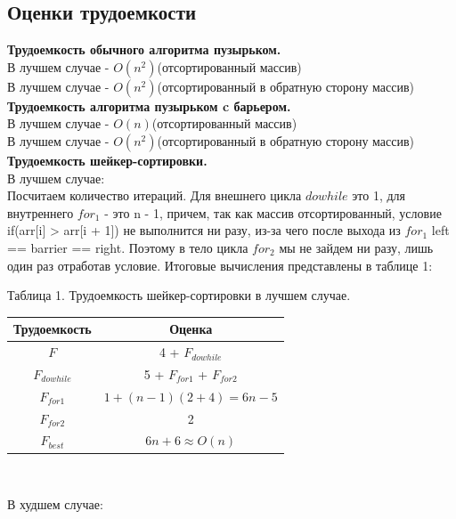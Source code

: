 \documentclass[a4paper, 14pt]{article}
\begin{document}
        \subsection{Оценки трудоемкости}
        \parindent=0cm
		\textbf{Трудоемкость обычного алгоритма пузырьком.}\\
		В лучшем случае - $O(n^2)$(отсортированный массив)\cite{knut}\\
		В лучшем случае - $O(n^2)$(отсортированный в обратную сторону массив)\cite{knut}\\
		\textbf{Трудоемкость алгоритма пузырьком c барьером.}\\
		В лучшем случае - $O(n)$(отсортированный массив)\cite{knut}\\
		В лучшем случае - $O(n^2)$(отсортированный в обратную сторону массив)\cite{knut}\\
		\textbf{Трудоемкость шейкер-сортировки.}\\
		В лучшем случае: \\
		\parindent=1cm
		Посчитаем количество итераций. Для внешнего цикла $do while$ это 1, для внутреннего $for_{1}$ - это n - 1, причем, так как массив отсортированный, условие if(arr[i] > arr[i + 1]) не выполнится ни разу, из-за чего после выхода из $for_{1}$ left == barrier == right. Поэтому в тело цикла $for_{2}$ мы не зайдем ни разу, лишь один раз отработав условие. Итоговые вычисления представлены в таблице 1:\\
        	\begin{center}
  	Таблица 1. Трудоемкость шейкер-сортировки в лучшем случае.\\
  		
		\begin{tabular}{ | c | c | }
        \hline
		Трудоемкость & Оценка\\ \hline
		$F$ & 4 + $F_{dowhile}$\\ \hline
		$F_{dowhile}$ & 5 + $F_{for1}$ + $F_{for2}$\\ \hline
		$F_{for1}$ & $1 + (n - 1)(2 + 4) = 6n - 5$\\ \hline
		$F_{for2}$ & 2\\ \hline
		\textbf{$F_{best}$} & \textbf{$6n + 6 \approx O(n)$}\\ \hline
		\hline
        \end{tabular}\\
        \end{center}
		В худшем случае: \\
\end{document}
